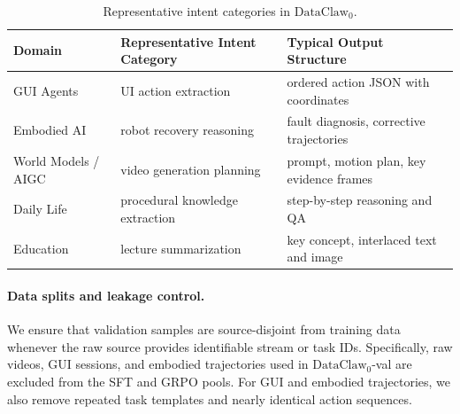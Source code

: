 \documentclass{llmxive}
\begin{document}

\begin{table}[!htbp]
\centering
\small
\begin{tabular}{lll}
\toprule
Domain & Representative Intent Category & Typical Output Structure \\
\midrule
GUI Agents & UI action extraction & ordered action JSON with coordinates \\
Embodied AI & robot recovery reasoning & fault diagnosis, corrective trajectories \\
World Models / AIGC & video generation planning & prompt, motion plan, key evidence frames \\
Daily Life & procedural knowledge extraction & step-by-step reasoning and QA \\
Education & lecture summarization & key concept, interlaced text and image \\
\bottomrule
\end{tabular}
\caption{Representative intent categories in $\text{DataClaw}_0$.}
\label{tab:intent_categories}
\end{table}

\paragraph{Data splits and leakage control.}
We ensure that validation samples are source-disjoint from training data whenever the raw source provides identifiable stream or task IDs. Specifically, raw videos, GUI sessions, and embodied trajectories used in $\text{DataClaw}_0$-val are excluded from the SFT and GRPO pools. For GUI and embodied trajectories, we also remove repeated task templates and nearly identical action sequences.
\end{document}
